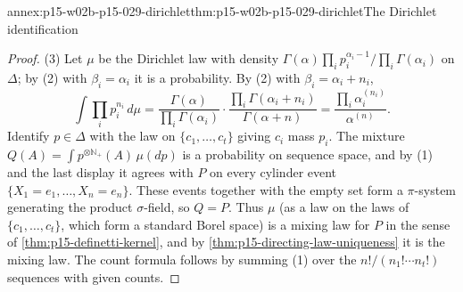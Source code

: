 \begin{annexitem}{annex:p15-w02b-p15-029-dirichlet}{thm:p15-w02b-p15-029-dirichlet}{The Dirichlet identification}
\begin{proof}
(3) Let \(\mu\) be the Dirichlet law with density
\(\Gamma(\alpha)\prod_ip_i^{\alpha_i-1}/\prod_i\Gamma(\alpha_i)\) on
\(\Delta\); by (2) with \(\beta_i=\alpha_i\) it is a probability. By
(2) with \(\beta_i=\alpha_i+n_i\),
\[
 \int\prod_ip_i^{n_i}\,d\mu=\frac{\Gamma(\alpha)}{\prod_i\Gamma(\alpha_i)}
 \cdot\frac{\prod_i\Gamma(\alpha_i+n_i)}{\Gamma(\alpha+n)}
 =\frac{\prod_i\alpha_i^{(n_i)}}{\alpha^{(n)}}.
\]
Identify \(p\in\Delta\) with the law on \(\{c_1,\ldots,c_t\}\) giving
\(c_i\) mass \(p_i\). The mixture \(Q(A)=\int p^{\otimes\mathbb N_+}(A)\,\mu(dp)\)
is a probability on sequence space, and by (1) and the last display it
agrees with \(P\) on every cylinder event
\(\{X_1=e_1,\ldots,X_n=e_n\}\). These events together with the empty set
form a \(\pi\)-system generating the product \(\sigma\)-field, so
\(Q=P\). Thus \(\mu\) (as a law on the laws of \(\{c_1,\ldots,c_t\}\),
which form a standard Borel space) is a mixing law for \(P\) in the
sense of \cref{thm:p15-definetti-kernel}, and by
\cref{thm:p15-directing-law-uniqueness} it is the mixing law. The count
formula follows by summing (1) over the
\(n!/(n_1!\cdots n_t!)\) sequences with given counts.
\end{proof}
\end{annexitem}


